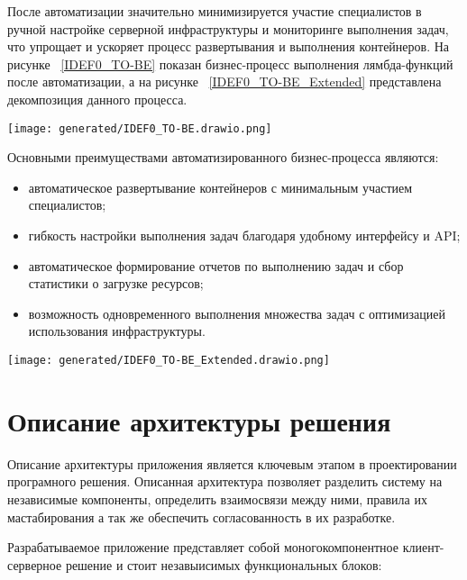 После автоматизации значительно минимизируется участие специалистов в ручной настройке серверной инфраструктуры и мониторинге выполнения задач, что упрощает и ускоряет процесс развертывания и выполнения контейнеров. На рисунке ~\ref{IDEF0_TO-BE} показан бизнес-процесс выполнения лямбда-функций после автоматизации, а на рисунке ~\ref{IDEF0_TO-BE_Extended} представлена декомпозиция данного процесса.

\begin{figure*}[!t]
  \centering
  \texttt{[image: generated/IDEF0\_TO-BE.drawio.png]}
  \caption{Процесс выполнения вычислений в бессерверной среде}
  \label{IDEF0_TO-BE}
\end{figure*}

Основными преимуществами автоматизированного бизнес-процесса являются:
\begin{itemize}
  \item[---]автоматическое развертывание контейнеров с минимальным участием специалистов;
  \item[---]гибкость настройки выполнения задач благодаря удобному интерфейсу и API;
  \item[---]автоматическое формирование отчетов по выполнению задач и сбор статистики о загрузке ресурсов;
  \item[---]возможность одновременного выполнения множества задач с оптимизацией использования инфраструктуры.
\end{itemize}

\begin{figure*}[!t]
  \centering
  \texttt{[image: generated/IDEF0\_TO-BE\_Extended.drawio.png]}
  \caption{Декомпозиция процесса выполения вычислений в бессерверверной среде}
  \label{IDEF0_TO-BE_Extended}
\end{figure*}

\section{Описание архитектуры решения}

Описание архитектуры приложения является ключевым этапом в проектировании програмного решения. Описанная архитектура позволяет разделить систему на независимые компоненты, определить взаимосвязи между ними, правила их мастабирования а так же обеспечить согласованность в их разработке. 

Разрабатываемое приложение представляет собой моногокомпонентное клиент-серверное решение и стоит незавыисимых функциональных блоков:

